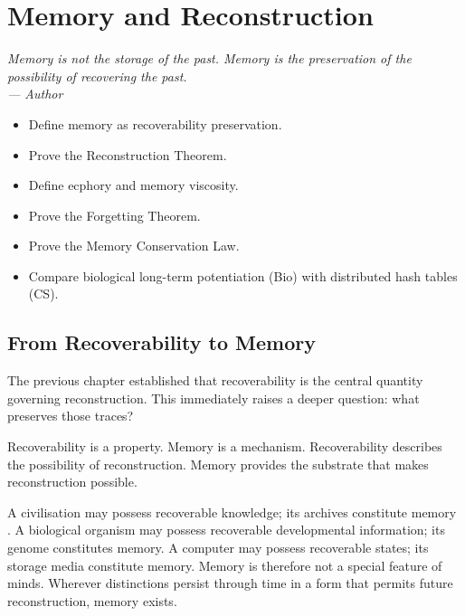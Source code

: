 \documentclass[12pt,twoside,openright]{book}
\newenvironment{epigraph}[2]{%
  \vspace{1em}\begin{flushright}
  \begin{minipage}{0.72\textwidth}
  \itshape\small #1\\[0.4em]
  \upshape\footnotesize\sffamily\color{DistGray}--- #2
  \end{minipage}\end{flushright}\vspace{1.5em}}{}
\newenvironment{objectives}{%
  \begin{tcolorbox}[colback=DistBlue!5,colframe=DistBlue,
    title={\faCheckCircle\enspace Learning Objectives},
    fonttitle=\sffamily\bfseries\color{white},
    attach boxed title to top left={yshift=-2mm,xshift=4mm},
    boxed title style={colback=DistBlue},breakable]
  \begin{itemize}[leftmargin=*,nosep]}{%
  \end{itemize}\end{tcolorbox}\vspace{1em}}
\begin{document}

\chapter{Memory and Reconstruction}
\label{ch:memory}

\begin{epigraph}{Memory is not the storage of the past.
  Memory is the preservation of the possibility of
  recovering the past.}{Author}
\end{epigraph}

\begin{objectives}
  \item Define memory as recoverability preservation.
  \item Prove the Reconstruction Theorem.
  \item Define ecphory and memory viscosity.
  \item Prove the Forgetting Theorem.
  \item Prove the Memory Conservation Law.
  \item Compare biological long-term potentiation (Bio)
        with distributed hash tables (CS).
\end{objectives}

\section{From Recoverability to Memory}
\label{sec:ch6-from}

The previous chapter established that recoverability is
the central quantity governing reconstruction. This
immediately raises a deeper question: what preserves
those traces?

Recoverability is a property. Memory is a mechanism.
Recoverability describes the possibility of reconstruction.
Memory provides the substrate that makes reconstruction
possible.

A civilisation may possess recoverable knowledge; its
archives constitute memory \parencite{tulving1983}.
A biological organism may possess recoverable developmental
information; its genome constitutes memory.
A computer may possess recoverable states; its storage
media constitute memory. Memory is therefore not a special
feature of minds. Wherever distinctions persist through
time in a form that permits future reconstruction,
memory exists.
\end{document}
